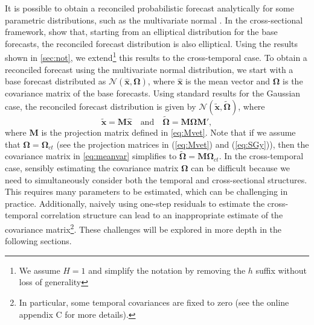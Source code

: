 \documentclass[review, 11pt]{elsarticle}
\newcommand{\xvet}{\bm{x}}
\newcommand{\Mvet}{\bm{M}}
\newcommand{\Omegavet}{\bm{\Omega}}
\theoremstyle{definition}
\begin{document}
It is possible to obtain a reconciled probabilistic forecast analytically for some parametric distributions, such as the multivariate normal \citep{corani2021, eckert2021, panagiotelis2023, wickramasuriya2021b}. In the cross-sectional framework, \cite{panagiotelis2023} show that, starting from an elliptical distribution for the base forecasts, the reconciled forecast distribution is also elliptical. Using the results shown in \autoref{sec:not}, we extend\footnote{We assume $H =1$ and simplify the notation by removing the $h$ suffix without loss of generality} this results to the cross-temporal case. To obtain a reconciled forecast using the multivariate normal distribution, we start with a base forecast distributed as $\mathcal{N}(\widehat{\xvet}, \Omegavet)$, where $\widehat{\xvet}$ is the mean vector and $\Omegavet$ is the covariance matrix of the base forecasts. Using standard results for the Gaussian case, the reconciled forecast distribution is given by $\mathcal{N}(\widetilde{\xvet}, \widetilde{\Omegavet})$, where
\begin{equation}\label{eq:meanvar}
	\widetilde{\xvet} = \Mvet\widehat{\xvet} \quad \mbox{and} \quad \widetilde{\Omegavet} = \Mvet \Omegavet \Mvet',
\end{equation}
where $\Mvet$ is the projection matrix defined in \eqref{eq:Mvet}.
Note that if we assume that $\Omegavet = \Omegavet_{ct}$ (see the projection matrices in (\ref{eq:Mvet}) and (\ref{eq:SGy})), then the covariance matrix in \eqref{eq:meanvar} simplifies to $\widetilde{\Omegavet} = \Mvet \Omegavet_{ct}$. In the cross-temporal case, sensibly estimating the covariance matrix $\Omegavet$ can be difficult because we need to simultaneously consider both the temporal and cross-sectional structures. This requires many parameters to be estimated, which can be challenging in practice. Additionally, naively using one-step residuals to estimate the cross-temporal correlation structure can lead to an inappropriate estimate of the covariance matrix\footnote{In particular, some temporal covariances are fixed to zero (see the online appendix C for more details).}. These challenges will be explored in more depth in the following sections.


\end{document}
